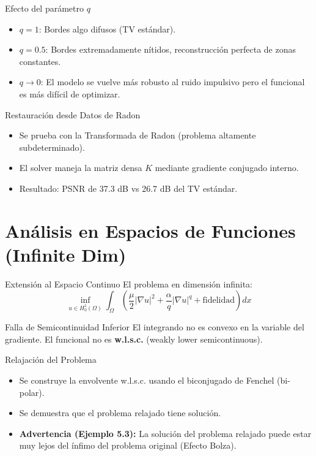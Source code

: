 \documentclass[10pt, aspectratio=169, xcolor={dvipsnames}]{beamer}
\begin{document}
\begin{frame}{Efecto del parámetro $q$}
    \begin{itemize}
        \item $q=1$: Bordes algo difusos (TV estándar).
        \item $q=0.5$: Bordes extremadamente nítidos, reconstrucción perfecta de zonas constantes.
        \item $q \to 0$: El modelo se vuelve más robusto al ruido impulsivo pero el funcional es más difícil de optimizar.
    \end{itemize}
\end{frame}

\begin{frame}{Restauración desde Datos de Radon}
    \begin{itemize}
        \item Se prueba con la Transformada de Radon (problema altamente subdeterminado).
        \item El solver maneja la matriz densa $K$ mediante gradiente conjugado interno.
        \item Resultado: PSNR de 37.3 dB vs 26.7 dB del TV estándar.
    \end{itemize}
\end{frame}

\section{Análisis en Espacios de Funciones (Infinite Dim)}

\begin{frame}{Extensión al Espacio Continuo}
    El problema en dimensión infinita:
    \[ \inf_{u \in H^1_0(\Omega)} \int_\Omega \left( \frac{\mu}{2}|\nabla u|^2 + \frac{\alpha}{q}|\nabla u|^q + \text{fidelidad} \right) dx \]
    \begin{alertblock}{Falla de Semicontinuidad Inferior}
        El integrando no es convexo en la variable del gradiente. El funcional no es \textbf{w.l.s.c.} (weakly lower semicontinuous).
    \end{alertblock}
\end{frame}

\begin{frame}{Relajación del Problema}
    \begin{itemize}
        \item Se construye la envolvente w.l.s.c. usando el biconjugado de Fenchel (bi-polar).
        \item Se demuestra que el problema relajado tiene solución.
        \item \textbf{Advertencia (Ejemplo 5.3):} La solución del problema relajado puede estar muy lejos del ínfimo del problema original (Efecto Bolza).
    \end{itemize}
\end{frame}
\end{document}
